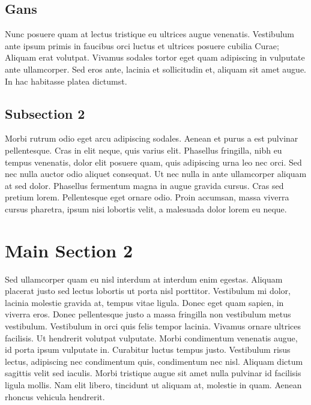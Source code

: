 \subsection{Gans}

Nunc posuere quam at lectus tristique eu ultrices augue venenatis. Vestibulum ante ipsum primis in faucibus orci luctus et ultrices posuere cubilia Curae; Aliquam erat volutpat. Vivamus sodales tortor eget quam adipiscing in vulputate ante ullamcorper. Sed eros ante, lacinia et sollicitudin et, aliquam sit amet augue. In hac habitasse platea dictumst.


\subsection{Subsection 2}
Morbi rutrum odio eget arcu adipiscing sodales. Aenean et purus a est pulvinar pellentesque. Cras in elit neque, quis varius elit. Phasellus fringilla, nibh eu tempus venenatis, dolor elit posuere quam, quis adipiscing urna leo nec orci. Sed nec nulla auctor odio aliquet consequat. Ut nec nulla in ante ullamcorper aliquam at sed dolor. Phasellus fermentum magna in augue gravida cursus. Cras sed pretium lorem. Pellentesque eget ornare odio. Proin accumsan, massa viverra cursus pharetra, ipsum nisi lobortis velit, a malesuada dolor lorem eu neque.


\section{Main Section 2}

Sed ullamcorper quam eu nisl interdum at interdum enim egestas. Aliquam placerat justo sed lectus lobortis ut porta nisl porttitor. Vestibulum mi dolor, lacinia molestie gravida at, tempus vitae ligula. Donec eget quam sapien, in viverra eros. Donec pellentesque justo a massa fringilla non vestibulum metus vestibulum. Vestibulum in orci quis felis tempor lacinia. Vivamus ornare ultrices facilisis. Ut hendrerit volutpat vulputate. Morbi condimentum venenatis augue, id porta ipsum vulputate in. Curabitur luctus tempus justo. Vestibulum risus lectus, adipiscing nec condimentum quis, condimentum nec nisl. Aliquam dictum sagittis velit sed iaculis. Morbi tristique augue sit amet nulla pulvinar id facilisis ligula mollis. Nam elit libero, tincidunt ut aliquam at, molestie in quam. Aenean rhoncus vehicula hendrerit.